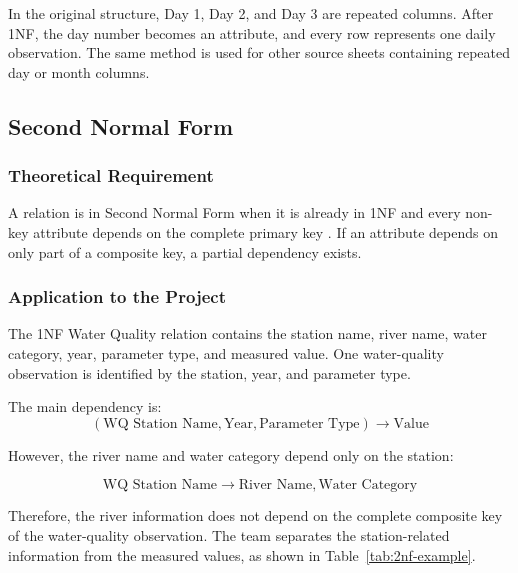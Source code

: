 In the original structure, Day 1, Day 2, and Day 3 are repeated columns. After
1NF, the day number becomes an attribute, and every row represents one daily
observation. The same method is used for other source sheets containing
repeated day or month columns.

\subsection{Second Normal Form}
\label{subsec:second-normal-form}

\subsubsection{Theoretical Requirement}

A relation is in Second Normal Form when it is already in 1NF and every
non-key attribute depends on the complete primary key
\cite{kent1983five}. If an attribute depends on only part of a composite key,
a partial dependency exists.

\subsubsection{Application to the Project}

The 1NF Water Quality relation contains the station name, river name, water
category, year, parameter type, and measured value. One water-quality
observation is identified by the station, year, and parameter type.

The main dependency is:
\[
(\text{WQ Station Name},\text{Year},\text{Parameter Type})
\rightarrow \text{Value}
\]

However, the river name and water category depend only on the station:

\[
\text{WQ Station Name}
\rightarrow
\text{River Name},\text{Water Category}
\]

Therefore, the river information does not depend on the complete composite
key of the water-quality observation. The team separates the station-related
information from the measured values, as shown in
Table~\ref{tab:2nf-example}.

